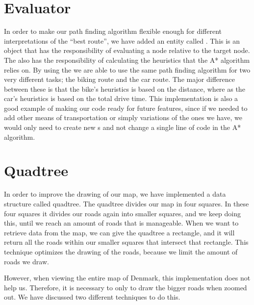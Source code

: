 \section{Evaluator}
\label{IMPL-EVA}
In order to make our path finding algorithm flexible enough for different 
interpretations of the ``best route'', we have added an entity called . 
This is an object that has the responsibility of evaluating a node relative to 
the target node. The  also has the responsibility of calculating the 
heuristics that the A* algorithm relies on. By using the  we are able to 
use the same path finding algorithm for two very different tasks; the biking route and 
the car route. The major difference between these is that the bike's heuristics is based 
on the distance, where as the car's heuristics is based on the total drive time. This 
implementation is also a good example of making our code ready for future features, 
since if we needed to add other means of transportation or simply variations of the ones 
we have, we would only need to create new s and not change 
a single line of code in the A* algorithm.

\section{Quadtree}
\label{IMPL-QT}
In order to improve the drawing of our map, we have implemented a data structure 
called quadtree. The quadtree divides our map in four squares. In these four squares 
it divides our roads again into smaller squares, and we keep doing this, until we reach 
an amount of roads that is manageable.
When we want to retrieve data from the map, we can give the quadtree a
rectangle, and it will return all the roads within our smaller squares that intersect
that rectangle. This technique optimizes the drawing of the roads, because we
limit the amount of roads we draw.

However, when viewing the entire map of Denmark, this implementation does not help 
us. Therefore, it is necessary to only to draw the bigger roads when zoomed out. We 
have discussed two different techniques to do this.

